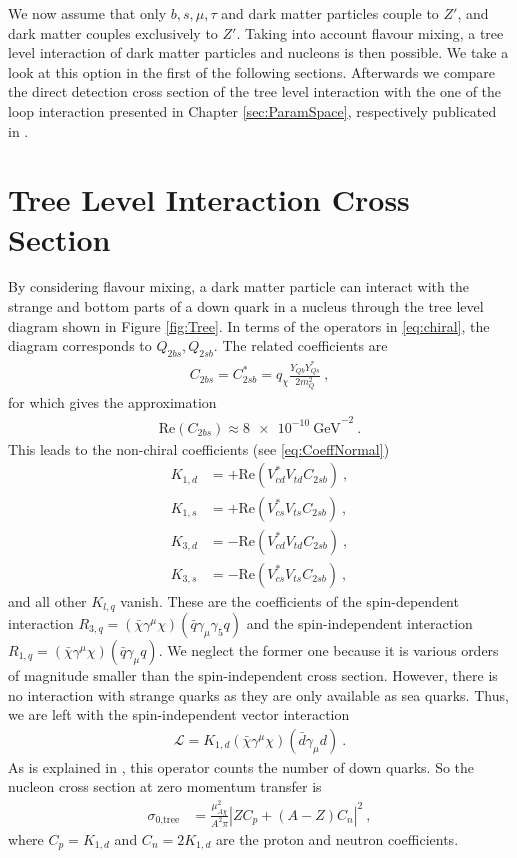 We now assume that only $b,s,\mu,\tau$ and dark matter particles couple to $Z'$, and dark matter couples exclusively to $Z'$. Taking into account flavour mixing, a tree level interaction of dark matter particles and nucleons is then possible. We take a look at this option in the first of the following sections. Afterwards we compare the direct detection cross section of the tree level interaction with the one of the loop interaction presented in Chapter \ref{sec:ParamSpace}, respectively publicated in \cite{Z}.

\section{Tree Level Interaction Cross Section}
By considering flavour mixing, a dark matter particle can interact with the strange and bottom parts of a down quark in a nucleus through the tree level diagram shown in Figure \ref{fig:Tree}. In terms of the operators in \eqref{eq:chiral}, the diagram corresponds to $Q_{2bs},Q_{2sb}$. The related coefficients are
\begin{align*}
	C_{2bs} = C_{2sb}^* = q_\chi\frac{Y_{Qb}Y_{Qs}^*}{2m_Q^2} \ ,
\end{align*}
for which \cite{InColour} gives the approximation
\begin{align}\label{eq:BoundC}
\text{Re}\left(C_{2bs}\right) \approx \SI{8e-10}{\giga\electronvolt}^{-2} \ .
\end{align}
This leads to the non-chiral coefficients (see \eqref{eq:CoeffNormal})
\begin{align*}
	K_{1,d} &= +\text{Re}(V_{cd}^*V_{td}C_{2sb}) \ , \\
	K_{1,s} &= +\text{Re}(V_{cs}^*V_{ts}C_{2sb}) \ , \\
	K_{3,d} &= -\text{Re}(V_{cd}^*V_{td}C_{2sb}) \ , \\
	K_{3,s} &= -\text{Re}(V_{cs}^*V_{ts}C_{2sb}) \ ,
\end{align*}
and all other $K_{l,q}$ vanish. These are the coefficients of the spin-dependent interaction $R_{3,q} = (\bar{\chi}\gamma^\mu\chi)(\bar{q}\gamma_\mu\gamma_5 q)$ and the spin-independent interaction $R_{1,q} = (\bar{\chi}\gamma^\mu\chi)(\bar{q}\gamma_\mu q)$. We neglect the former one because it is various orders of magnitude smaller than the spin-independent cross section. However, there is no interaction with strange quarks as they are only available as sea quarks. Thus, we are left with the spin-independent vector interaction
\begin{align*}
	\mathcal{L} = K_{1,d}(\bar{\chi}\gamma^\mu\chi)(\bar{d}\gamma_\mu d) \ .
\end{align*}
As is explained in \cite[Chapter 7]{Supersymmetric}, this operator counts the number of down quarks. So the nucleon cross section at zero momentum transfer is
\begin{align}\label{eq:Tree}
	\sigma_\text{0,tree} &= \frac{\mu_{A\chi}^2}{A^2\pi}\left|ZC_p +(A-Z)C_n\right|^2 \ ,
\end{align}
where $C_p = K_{1,d}$ and $C_n = 2K_{1,d}$ are the proton and neutron coefficients.


